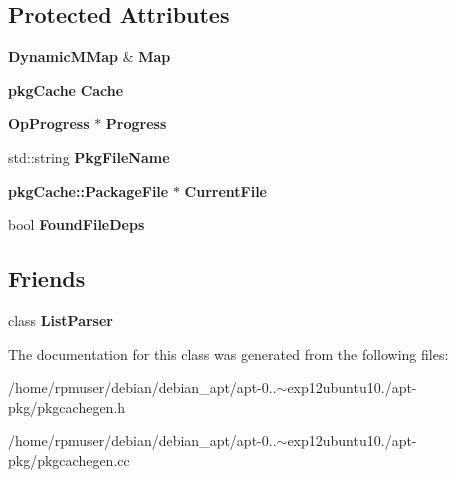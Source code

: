\subsection*{\-Protected \-Attributes}
\begin{DoxyCompactItemize}
\item 
{\bf \-Dynamic\-M\-Map} \& {\bfseries \-Map}\label{classpkgCacheGenerator_adc0c5b928b6060ced0d3323742f7883a}

\item 
{\bf pkg\-Cache} {\bfseries \-Cache}\label{classpkgCacheGenerator_a26c4fabad3657344ca6a4b1e25a842dc}

\item 
{\bf \-Op\-Progress} $\ast$ {\bfseries \-Progress}\label{classpkgCacheGenerator_a926d37269e144f3ed29f063664b270bc}

\item 
std\-::string {\bfseries \-Pkg\-File\-Name}\label{classpkgCacheGenerator_a0049294d45ee49774a46d487fa73e83a}

\item 
{\bf pkg\-Cache\-::\-Package\-File} $\ast$ {\bfseries \-Current\-File}\label{classpkgCacheGenerator_a02726a8d56490ca4bce9ca2e9001d411}

\item 
bool {\bfseries \-Found\-File\-Deps}\label{classpkgCacheGenerator_a8a31c3587cc062cc70781abfbd3141a9}

\end{DoxyCompactItemize}
\subsection*{\-Friends}
\begin{DoxyCompactItemize}
\item 
class {\bfseries \-List\-Parser}\label{classpkgCacheGenerator_a64990507f149a60e81401427b693d8a9}

\end{DoxyCompactItemize}


\-The documentation for this class was generated from the following files\-:\begin{DoxyCompactItemize}
\item 
/home/rpmuser/debian/debian\-\_\-apt/apt-\/0..$\sim$exp12ubuntu10./apt-\/pkg/pkgcachegen.\-h\item 
/home/rpmuser/debian/debian\-\_\-apt/apt-\/0..$\sim$exp12ubuntu10./apt-\/pkg/pkgcachegen.\-cc\end{DoxyCompactItemize}
